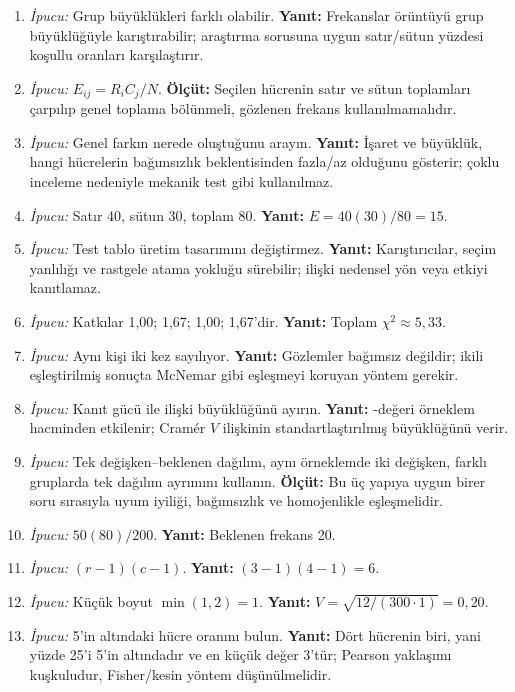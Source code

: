 \begin{enumerate}[leftmargin=*,itemsep=5pt]
\item \emph{İpucu:} Grup büyüklükleri farklı olabilir.
\textbf{Yanıt:} Frekanslar örüntüyü grup büyüklüğüyle karıştırabilir; araştırma
sorusuna uygun satır/sütun yüzdesi koşullu oranları karşılaştırır.
\item \emph{İpucu:} $E_{ij}=R_iC_j/N$.
\textbf{Ölçüt:} Seçilen hücrenin satır ve sütun toplamları çarpılıp genel
toplama bölünmeli, gözlenen frekans kullanılmamalıdır.
\item \emph{İpucu:} Genel farkın nerede oluştuğunu arayın.
\textbf{Yanıt:} İşaret ve büyüklük, hangi hücrelerin bağımsızlık beklentisinden
fazla/az olduğunu gösterir; çoklu inceleme nedeniyle mekanik test gibi kullanılmaz.
\item \emph{İpucu:} Satır 40, sütun 30, toplam 80.
\textbf{Yanıt:} $E=40(30)/80=15$.
\item \emph{İpucu:} Test tablo üretim tasarımını değiştirmez.
\textbf{Yanıt:} Karıştırıcılar, seçim yanlılığı ve rastgele atama yokluğu
sürebilir; ilişki nedensel yön veya etkiyi kanıtlamaz.
\item \emph{İpucu:} Katkılar 1,00; 1,67; 1,00; 1,67'dir.
\textbf{Yanıt:} Toplam $\chi^2\approx5{,}33$.
\item \emph{İpucu:} Aynı kişi iki kez sayılıyor.
\textbf{Yanıt:} Gözlemler bağımsız değildir; ikili eşleştirilmiş sonuçta
McNemar gibi eşleşmeyi koruyan yöntem gerekir.
\item \emph{İpucu:} Kanıt gücü ile ilişki büyüklüğünü ayırın.
\textbf{Yanıt:} \pval-değeri örneklem hacminden etkilenir; Cramér $V$ ilişkinin
standartlaştırılmış büyüklüğünü verir.
\item \emph{İpucu:} Tek değişken--beklenen dağılım, aynı örneklemde iki değişken,
farklı gruplarda tek dağılım ayrımını kullanın. \textbf{Ölçüt:} Bu üç yapıya
uygun birer soru sırasıyla uyum iyiliği, bağımsızlık ve homojenlikle eşleşmelidir.
\item \emph{İpucu:} $50(80)/200$.
\textbf{Yanıt:} Beklenen frekans 20.
\item \emph{İpucu:} $(r-1)(c-1)$.
\textbf{Yanıt:} $(3-1)(4-1)=6$.
\item \emph{İpucu:} Küçük boyut $\min(1,2)=1$.
\textbf{Yanıt:} $V=\sqrt{12/(300\cdot1)}=0{,}20$.
\item \emph{İpucu:} 5'in altındaki hücre oranını bulun.
\textbf{Yanıt:} Dört hücrenin biri, yani yüzde 25'i 5'in altındadır ve en
küçük değer 3'tür; Pearson yaklaşımı kuşkuludur, Fisher/kesin yöntem düşünülmelidir.

\end{enumerate}
